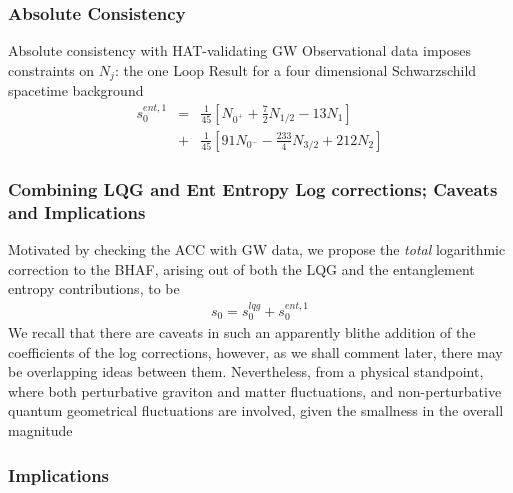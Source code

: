 \documentclass[11pt]{article}
\begin{document}
{\subsubsection{Absolute Consistency}

Absolute consistency with HAT-validating GW Observational data imposes constraints on $N_j$: the one Loop Result for a four dimensional Schwarzschild spacetime background
\begin{eqnarray}
s^{ent,1}_0 &=& \frac{1}{45} \left[ N_{0^+} + \frac72 N_{1/2} - 13 N_1 \right] \nonumber  \\
&+& \frac{1}{45} \left[ 91 N_{0^-} -\frac{233}{4} N_{3/2} + 212 N_2 \right] \label{1lpsch}
\end{eqnarray}

\subsubsection{Combining LQG and Ent Entropy Log corrections; Caveats and Implications \cite{pm2026}}

Motivated by checking the ACC with GW data, we propose the {\it total} logarithmic correction to the BHAF, arising out of both the LQG and the entanglement entropy contributions, to be
\begin{eqnarray}
s_0 = s_0^{lqg} + s_0^{ent,1} \label{combo}
\end{eqnarray}
We recall that there are caveats in such an apparently blithe addition of the coefficients of the log corrections, however, as we shall comment later, there may be overlapping ideas between them. Nevertheless, from a physical standpoint, where both perturbative graviton and matter fluctuations, and non-perturbative quantum geometrical fluctuations are involved, given the smallness in the overall magnitude

\subsubsection{Implications \cite{pm2026}}

}
\end{document}
